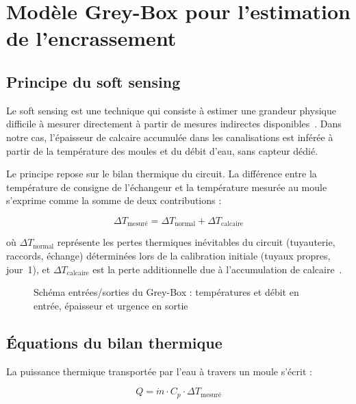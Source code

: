 \section{Modèle Grey-Box pour l'estimation de l'encrassement}

\subsection{Principe du soft sensing}

Le soft sensing est une technique qui consiste à estimer une grandeur physique difficile à mesurer directement à partir de mesures indirectes disponibles~\cite{bib27}. Dans notre cas, l'épaisseur de calcaire accumulée dans les canalisations est inférée à partir de la température des moules et du débit d'eau, sans capteur dédié.

Le principe repose sur le bilan thermique du circuit. La différence entre la température de consigne de l'échangeur et la température mesurée au moule s'exprime comme la somme de deux contributions :

\begin{equation}
\Delta T_{\text{mesuré}} = \Delta T_{\text{normal}} + \Delta T_{\text{calcaire}}
\label{eq:bilan}
\end{equation}

où \(\Delta T_{\text{normal}}\) représente les pertes thermiques inévitables du circuit (tuyauterie, raccords, échange) déterminées lors de la calibration initiale (tuyaux propres, jour~1), et \(\Delta T_{\text{calcaire}}\) est la perte additionnelle due à l'accumulation de calcaire~\cite{bib22}.

\begin{figure}[htbp]
  \centering
  \caption{Schéma entrées/sorties du Grey-Box : températures et débit en entrée, épaisseur et urgence en sortie}
\end{figure}

\subsection{Équations du bilan thermique}

La puissance thermique transportée par l'eau à travers un moule s'écrit :

\begin{equation}
Q = \dot{m} \cdot C_p \cdot \Delta T_{\text{mesuré}}
\label{eq:puissance}
\end{equation}

